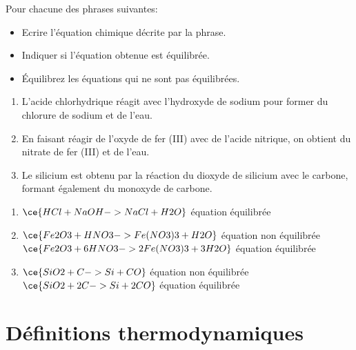 \documentclass[
  11pt,
  a4paper,
  openany]{book}
\providecommand{\tightlist}{%
  \setlength{\itemsep}{0pt}\setlength{\parskip}{0pt}}
\begin{document}
\begin{Exercise}

Pour chacune des phrases suivantes:

\begin{itemize}
\tightlist
\item
  Ecrire l'équation chimique décrite par la phrase.
\item
  Indiquer si l'équation obtenue est équilibrée.
\item
  Équilibrez les équations qui ne sont pas équilibrées.
\end{itemize}

\begin{enumerate}
\def\labelenumi{\arabic{enumi}.}
\tightlist
\item
  L'acide chlorhydrique réagit avec l'hydroxyde de sodium pour former du chlorure de sodium et de l'eau.
\item
  En faisant réagir de l'oxyde de fer (III) avec de l'acide nitrique, on obtient du nitrate de fer (III) et de l'eau.
\item
  Le silicium est obtenu par la réaction du dioxyde de silicium avec le carbone, formant également du monoxyde de carbone.
\end{enumerate}

\end{Exercise}

\begin{Answer}

\begin{enumerate}
\def\labelenumi{\arabic{enumi}.}
\item
  \(\ce{HCl + NaOH -> NaCl + H2O}\) équation équilibrée
\item
  \(\ce{Fe2O3 + HNO3 -> Fe(NO3)3 + H2O}\) équation non équilibrée\\
  \(\ce{Fe2O3 + 6HNO3 -> 2Fe(NO3)3 + 3H2O}\) équation équilibrée
\item
  \(\ce{SiO2 + C -> Si + CO}\) équation non équilibrée\\
  \(\ce{SiO2 + 2C -> Si + 2CO}\) équation équilibrée
\end{enumerate}

\end{Answer}

\newpage

\section{Définitions thermodynamiques}\label{duxe9finitions-thermodynamiques}
\end{document}
